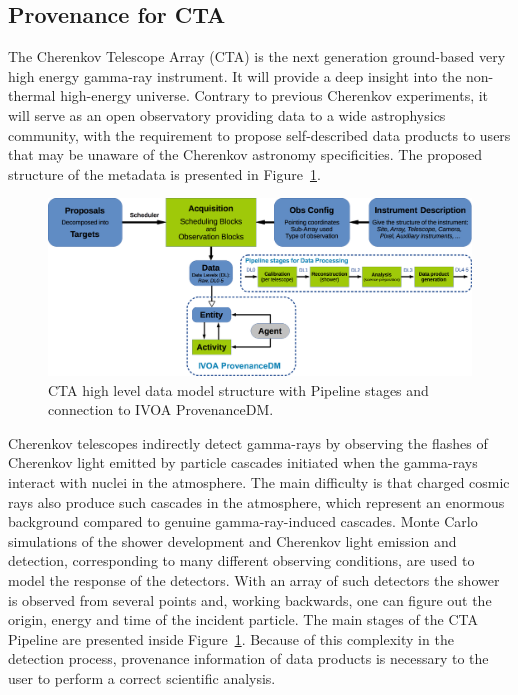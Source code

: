 \subsection{Provenance for CTA}

The Cherenkov Telescope Array (CTA) is the next generation ground-based very high energy gamma-ray instrument. It will provide a deep insight into the non-thermal high-energy universe. Contrary to previous Cherenkov experiments, it will serve as an open observatory providing data to a wide astrophysics community, with the requirement to propose self-described data products to users that may be unaware of the Cherenkov astronomy specificities. The proposed structure of the metadata is presented in Figure~\ref{fig:cta_dm}.

\begin{figure}
\centering
\includegraphics[width=\textwidth]{CTA_DM_high_level.png}
\caption{CTA high level data model structure with Pipeline stages and connection to IVOA ProvenanceDM.}
\label{fig:cta_dm}
\end{figure}

Cherenkov telescopes indirectly detect gamma-rays by observing the flashes of Cherenkov light emitted by particle cascades initiated when the gamma-rays interact with nuclei in the atmosphere. The main difficulty  is that charged cosmic rays also produce such cascades in the atmosphere, which represent an enormous background compared to genuine gamma-ray-induced cascades. Monte Carlo simulations of the shower development and Cherenkov light emission and detection, corresponding to many different observing conditions, are used to model the response of the detectors.  With an array of such detectors the shower is observed  from several points and, working backwards, one can figure out the origin, energy and time of the incident particle. The main stages of the CTA Pipeline are presented inside Figure~\ref{fig:cta_dm}. Because of this complexity in the detection process, provenance information of data products is necessary to the user to perform a correct scientific analysis.

